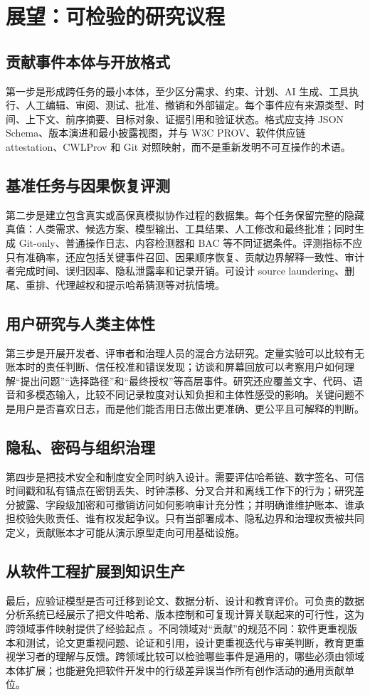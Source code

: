\documentclass[UTF8,a4paper,12pt]{ctexart}
\begin{document}
\section{展望：可检验的研究议程}
\subsection{贡献事件本体与开放格式}
第一步是形成跨任务的最小本体，至少区分需求、约束、计划、AI 生成、工具执行、人工编辑、审阅、测试、批准、撤销和外部锚定。每个事件应有来源类型、时间、上下文、前序摘要、目标对象、证据引用和验证状态。格式应支持 JSON Schema、版本演进和最小披露视图，并与 W3C PROV、软件供应链 attestation、CWLProv 和 Git 对照映射，而不是重新发明不可互操作的术语。

\subsection{基准任务与因果恢复评测}
第二步是建立包含真实或高保真模拟协作过程的数据集。每个任务保留完整的隐藏真值：人类需求、候选方案、模型输出、工具结果、人工修改和最终批准；同时生成 Git-only、普通操作日志、内容检测器和 BAC 等不同证据条件。评测指标不应只有准确率，还应包括关键事件召回、因果顺序恢复、贡献边界解释一致性、审计者完成时间、误归因率、隐私泄露率和记录开销。可设计 source laundering、删尾、重排、代理越权和提示哈希猜测等对抗情境。

\subsection{用户研究与人类主体性}
第三步是开展开发者、评审者和治理人员的混合方法研究。定量实验可以比较有无账本时的责任判断、信任校准和错误发现；访谈和屏幕回放可以考察用户如何理解“提出问题”“选择路径”和“最终授权”等高层事件。研究还应覆盖文字、代码、语音和多模态输入，比较不同记录粒度对认知负担和主体性感受的影响。关键问题不是用户是否喜欢日志，而是他们能否用日志做出更准确、更公平且可解释的判断。

\subsection{隐私、密码与组织治理}
第四步是把技术安全和制度安全同时纳入设计。需要评估哈希链、数字签名、可信时间戳和私有锚点在密钥丢失、时钟漂移、分叉合并和离线工作下的行为；研究差分披露、字段级加密和可撤销访问如何影响审计充分性；并明确谁维护账本、谁承担校验失败责任、谁有权发起争议。只有当部署成本、隐私边界和治理权责被共同定义，贡献账本才可能从演示原型走向可用基础设施。

\subsection{从软件工程扩展到知识生产}
最后，应验证模型是否可迁移到论文、数据分析、设计和教育评价。可负责的数据分析系统已经展示了把文件哈希、版本控制和可复现计算关联起来的可行性，这为跨领域事件映射提供了经验起点 \cite{asystemfor2018}。不同领域对“贡献”的规范不同：软件更重视版本和测试，论文更重视问题、论证和引用，设计更重视迭代与审美判断，教育更重视学习者的理解与反馈。跨领域比较可以检验哪些事件是通用的，哪些必须由领域本体扩展；也能避免把软件开发中的行级差异误当作所有创作活动的通用贡献单位。
\end{document}
